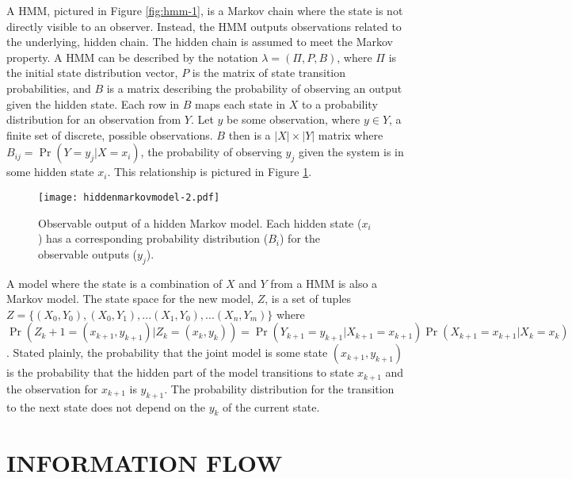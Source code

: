 A \ac{HMM}, pictured in Figure \ref{fig:hmm-1}, is a Markov chain where the state is not directly visible to an observer\cite{hidden-markov}.
Instead, the \ac{HMM} outputs observations related to the underlying, hidden chain.
The hidden chain is assumed to meet the Markov property.
A \ac{HMM} can be described by the notation $\lambda = (\Pi, P, B)$, where $\Pi$ is the initial state distribution vector, $P$ is the matrix of state transition probabilities, and $B$ is a matrix describing the probability of observing an output given the hidden state.
Each row in $B$ maps each state in $X$ to a probability distribution for an observation from $Y$.
Let $y$ be some observation, where $y \in Y$, a finite set of discrete, possible observations.
$B$ then is a $|X|\times|Y|$ matrix where $B_{ij} = \Pr(Y=y_j|X=x_i)$, the probability of observing $y_j$ given the system is in some hidden state $x_i$.
This relationship is pictured in Figure \ref{fig:hmm-2}.

\begin{figure}
	\centering
	\texttt{[image: hiddenmarkovmodel-2.pdf]}
	\caption[Observable output of a hidden Markov model.]{Observable output of a hidden Markov model. Each hidden state ($x_i$) has a corresponding probability distribution ($B_i$) for the observable outputs ($y_j$).}
	\label{fig:hmm-2}
\end{figure}

A model where the state is a combination of $X$ and $Y$ from a \ac{HMM} is also a Markov model.
The state space for the new model, $Z$, is a set of tuples $Z = \{(X_0,Y_0), (X_0, Y_1), ... (X_1, Y_0), ... (X_n,Y_m)  \}$ where $\Pr(Z_k+1=(x_{k+1}, y_{k+1})|Z_k=(x_k, y_k)) = \Pr(Y_{k+1}=y_{k+1}|X_{k+1}=x_{k+1})\Pr(X_{k+1}=x_{k+1}|X_{k}=x_k)$.
Stated plainly, the probability that the joint model is some state $(x_{k+1},y_{k+1})$ is the probability that the hidden part of the model transitions to state $x_{k+1}$ and the observation for $x_{k+1}$ is $y_{k+1}$.
The probability distribution for the transition to the next state does not depend on the $y_k$ of the current state.

\section{INFORMATION FLOW}

